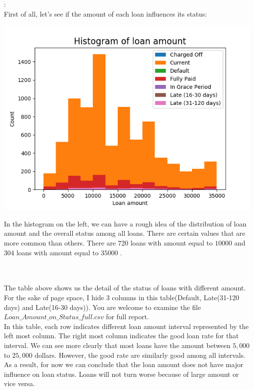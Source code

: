 \documentclass[10pt]{article}
\newenvironment{sect}[2][Section]{\begin{trivlist}
\item[\hskip \labelsep {\bfseries #2}]}{\end{trivlist}}
\begin{document}
\begin{sect}{Loan Amount}
:\\
First of all, let's see if the amount of each loan influences its status:\\
\begin{minipage}{0.5\textwidth}
\includegraphics[width=\textwidth]{loan_amount_hist.png}
\end{minipage}
\begin{minipage}{0.5\textwidth}
In the histogram on the left, we can have a rough idea of the distribution of loan amount and the overall status among all loans. There are certain values that are more common than others. There are $720$ loans with amount equal to $10000$ and $304$ loans with amount equal to $35000$ .
\end{minipage}
\footnotesize{}\\\\
\normalsize
The table above shows us the detail of the status of loans with different amount. For the sake of page space, I hide 3 columns in this table(Default, Late(31-120 days) and Late(16-30 days)). You are welcome to examine the file $Loan\_Amount\_on\_Status\_full.csv$ for full report.\\
In this table, each row indicates different loan amount interval represented by the left most column. The right most column indicates the good loan rate for that interval. We can see more clearly that most loans have the amount between $5,000$ to $25,000$ dollars. However, the good rate are similarly good among all intervals. As a result, for now we can conclude that the loan amount does not have major influence on loan status. Loans will not turn worse because of large amount or vice versa.

\end{sect}
\end{document}

